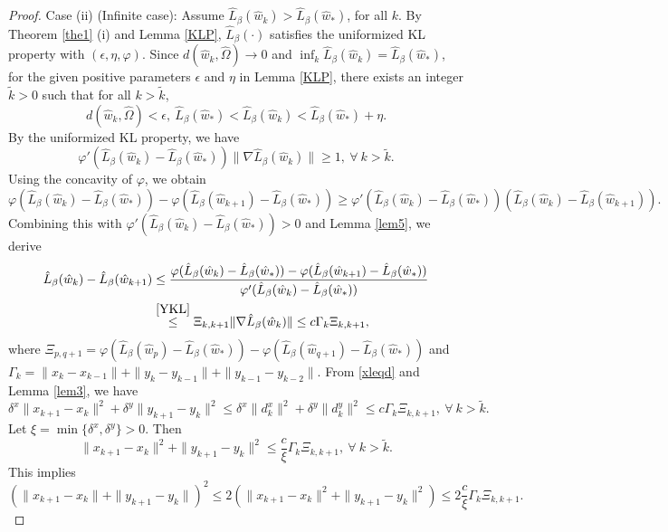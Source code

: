 \documentclass[pdflatex,sn-mathphys-num]{sn-jnl}%
\theoremstyle{thmstyleone}%
\theoremstyle{thmstyletwo}%
\theoremstyle{thmstylethree}%
\begin{document}
\begin{proof}
Case (ii) (Infinite case): Assume $\hat{L}_{\beta}(\hat{w}_{k})>\hat{L}_{\beta}(\hat{w}_{*})$, for all $k$. By Theorem \ref{the1} (i) and Lemma \ref{KLP}, $\hat{L}_{\beta}(\cdot)$ satisfies the uniformized KL property with $(\epsilon,\eta,\varphi)$. Since $d(\hat{w}_k, \hat{\Omega}) \to 0$ and $\inf_k \hat{L}_{\beta}(\hat{w}_{k})=\hat{L}_{\beta}(\hat{w}_{*})$, for the given positive parameters $\epsilon$ and $\eta$ in Lemma \ref{KLP}, there exists an integer $\tilde{k}>0$ such that for all $k>\tilde{k}$,
\[
d(\hat{w}_k, \hat{\Omega}) <\epsilon,~\hat{L}_{\beta}(\hat{w}_{*})<\hat{L}_{\beta}(\hat{w}_{k})<\hat{L}_{\beta}(\hat{w}_{*})+\eta.
\]
By the uniformized KL property, we have
\begin{equation}\label{YKL}
\varphi ' (\hat{L}_{\beta}(\hat{w}_{k})-\hat{L}_{\beta}(\hat{w}_{*}))\|\nabla\hat{L}_{\beta}(\hat{w}_{k})\|\geq 1,~\forall~k>\tilde{k}.
\end{equation}
Using the concavity of $\varphi$, we obtain
\[\varphi(\hat{L}_{\beta}(\hat{w}_{k})-\hat{L}_{\beta}(\hat{w}_{*}))-\varphi(\hat{L}_{\beta}(\hat{w}_{k+1})-\hat{L}_{\beta}(\hat{w}_{*}))
\geq  \varphi'(\hat{L}_{\beta}(\hat{w}_{k})-\hat{L}_{\beta}(\hat{w}_{*}))(\hat{L}_{\beta}(\hat{w}_{k})-\hat{L}_{\beta}(\hat{w}_{k+1})).\]
Combining this with $\varphi'(\hat{L}_{\beta}(\hat{w}_{k})-\hat{L}_{\beta}(\hat{w}_{*}))>0$ and Lemma \ref{lem5}, we derive
\[\begin{aligned}
\hat{L}_{\beta}(\hat{w}_{k})-\hat{L}_{\beta}(\hat{w}_{k+1}) &\leq \frac{\varphi(\hat{L}_{\beta}(\hat{w}_{k})-\hat{L}_{\beta}(\hat{w}_{*}))-\varphi(\hat{L}_{\beta}(\hat{w}_{k+1})
	-\hat{L}_{\beta}(\hat{w}_{*}))}{\varphi'(\hat{L}_{\beta}(\hat{w}_{k})-\hat{L}_{\beta}(\hat{w}_{*}))}\\
&\overset{\eqref{YKL}}{\leq} \Xi_{k,k+1} \|\nabla \hat{L}_{\beta}(\hat{w}_{k})\| \leq c \Gamma_k \Xi_{k,k+1},
\end{aligned}\]
where $\Xi_{p,q+1}=\varphi(\hat{L}_{\beta}(\hat{w}_{p})-\hat{L}_{\beta}(\hat{w}_{*}))
-\varphi(\hat{L}_{\beta}(\hat{w}_{q+1})-\hat{L}_{\beta}(\hat{w}_{*}))$ and $\Gamma_k=\|{x}_{k}-x_{k-1}\|+\|{y}_{k}-y_{k-1}\|+\|{y}_{k-1}-y_{k-2}\|$.
From \eqref{xleqd} and Lemma \ref{lem3}, we have
\[\delta^x\|{x}_{k+1}-x_{k}\|^2+\delta^y \|{y}_{k+1}-y_{k}\|^2 \leq \delta^x \|d_{k}^x\|^2+\delta^y \|d_{k}^y\|^2 \leq c \Gamma_k\Xi_{k,k+1},~\forall~k>\tilde{k}.\]
Let $\xi=\min\{\delta^x,\delta^y\}>0$. Then
\[\|{x}_{k+1}-x_{k}\|^2+\|{y}_{k+1}-y_{k}\|^2 \leq \frac{c}{\xi} \Gamma_k \Xi_{k,k+1},~\forall~k>\tilde{k}.\]
This implies
\[(\|{x}_{k+1}-x_{k}\|+\|{y}_{k+1}-y_{k}\|)^2 \leq 2(\|{x}_{k+1}-x_{k}\|^2+\|{y}_{k+1}-y_{k}\|^2) \leq 2\frac{c}{\xi} \Gamma_k \Xi_{k,k+1}.\]

\end{proof}
\end{document}
